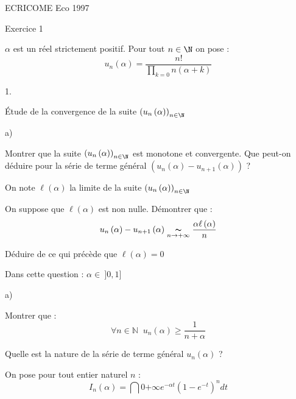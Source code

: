 \documentclass[11pt]{article}%
\begin{document}
\begin{center}
{\Huge ECRICOME Eco 1997}
\end{center}


\begin{center}
{\LARGE Exercice 1}
\end{center}

$\alpha $ est un réel strictement positif. Pour tout $n\in \N$
on pose : 
\[
u_{n}\left( \alpha \right) = \frac{n!}{\prod\limits_{k = 0}{n}\left(
\alpha
 + k\right) } 
\]

\begin{noliste}{1.}
 \setlength{\itemsep}{4mm}
\item Étude de la convergence de la suite $\left( u_{n}\left( \alpha
\right)
\right)_{n\in \N}$

\begin{noliste}{a)}
 \setlength{\itemsep}{2mm}
\item Montrer que la suite $\left( u_{n}\left( \alpha \right)
\right)_{n\in 
\N}$ est monotone et convergente. Que peut-on déduire pour la série de
terme général $\left( u_{n}\left( \alpha \right)
-u_{n + 1}\left( \alpha \right) \right) $ ?

On note $\ell \left( \alpha \right) $ la limite de la suite $\left(
u_{n}\left( \alpha \right) \right)_{n\in \N}$

\item On suppose que $\ell \left( \alpha \right) $ est non nulle.
Démontrer que : 
\[
u_{n}\left( \alpha \right) -u_{n + 1}\left( \alpha \right)
\underset{n\rightarrow + \infty }{\thicksim }\frac{\alpha \ell \left(
\alpha \right) }{n} 
\]

\item Déduire de ce qui précède que $\ell \left( \alpha \right)
 = 0$
\end{noliste}

\item Dans cette question : $\alpha \in \ ]0,1]$

\begin{noliste}{a)}
 \setlength{\itemsep}{2mm}
\item Montrer que : 
\[
\forall n\in \mathbb{N\;\;}u_{n}\left( \alpha \right) \geq \frac{1}{n +
\alpha }
\]

\item Quelle est la nature de la série de terme général $u_{n}\left(
\alpha \right) $ ?
\end{noliste}

\item On pose pour tout entier naturel $n$ : 
\[
I_{n}\left( \alpha \right) = \dint{0}{+ \infty }e^{-\alpha t}\left(
1-e^{-t}\right) ^{n}dt 
\]


\end{noliste}
\end{document}
